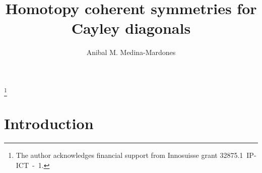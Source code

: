 \documentclass{amsart}
\begin{document}
	
\title{Homotopy coherent symmetries for Cayley diagonals}
\author{Anibal M. Medina-Mardones}
\address{Max Plank Institute for Mathematics, Bonn, Germany}
\address{Department of Mathematics, University of Notre Dame, Notre Dame, IN, USA}
\thanks{The author acknowledges financial support from Innosuisse grant \mbox{32875.1 IP-ICT - 1}.}

\begin{abstract}
	
\end{abstract} 

\vspace*{-.8cm}

\maketitle

\section{Introduction}



\end{document}
